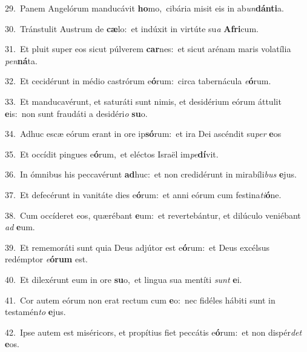 {\numbfont\textcolor{\numbcolor}{29.}}~Panem Angelórum manducávit \textbf{ho}\-mo,~\star cibária misit eis in ab\-\textit{un}\-\textbf{dán}\textbf{ti}a.\par
{\numbfont\textcolor{\numbcolor}{30.}}~Tránstulit Austrum de \textbf{cæ}\-lo:~\star et indúxit in virtúte su\textit{a} \textbf{A}\-\textbf{fri}cum.\par
{\numbfont\textcolor{\numbcolor}{31.}}~Et pluit super eos sicut púlverem \textbf{car}\-nes:~\star et sicut arénam maris volatília \textit{pen}\-\textbf{ná}ta.\par
{\numbfont\textcolor{\numbcolor}{32.}}~Et cecidérunt in médio castrórum e\-\textbf{ó}\-rum:~\star circa tabernácula \textit{e}\-\textbf{ó}rum.\par
{\numbfont\textcolor{\numbcolor}{33.}}~Et manducavérunt, et saturáti sunt nimis, et desidérium eórum áttulit \textbf{e}\-is:~\star non sunt fraudáti a desidéri\textit{o} \textbf{su}\-o.\par
{\numbfont\textcolor{\numbcolor}{34.}}~Adhuc escæ eórum erant in ore ip\-\textbf{só}\-rum:~\star et ira Dei ascéndit su\textit{per} \textbf{e}\-os\par
{\numbfont\textcolor{\numbcolor}{35.}}~Et occídit pingues e\-\textbf{ó}\-rum,~\star et eléctos Israël im\-\textit{pe}\-\textbf{dí}vit.\par
{\numbfont\textcolor{\numbcolor}{36.}}~In ómnibus his peccavérunt \textbf{ad}\-huc:~\star et non credidérunt in mirabíli\textit{bus} \textbf{e}\-jus.\par
{\numbfont\textcolor{\numbcolor}{37.}}~Et defecérunt in vanitáte dies e\-\textbf{ó}\-rum:~\star et anni eórum cum festina\-\textit{ti}\-\textbf{ó}ne.\par
{\numbfont\textcolor{\numbcolor}{38.}}~Cum occíderet eos, quærébant \textbf{e}\-um:~\star et revertebántur, et dilúculo veniébant \textit{ad} \textbf{e}\-um.\par
{\numbfont\textcolor{\numbcolor}{39.}}~Et rememoráti sunt quia Deus adjútor est e\-\textbf{ó}\-rum:~\star et Deus excélsus redémptor \textit{e}\-\textbf{ó}\textbf{rum} est.\par
{\numbfont\textcolor{\numbcolor}{40.}}~Et dilexérunt eum in ore \textbf{su}\-o,~\star et lingua sua mentíti \textit{sunt} \textbf{e}\-i.\par
{\numbfont\textcolor{\numbcolor}{41.}}~Cor autem eórum non erat rectum cum \textbf{e}\-o:~\star nec fidéles hábiti sunt in testamén\textit{to} \textbf{e}\-jus.\par
{\numbfont\textcolor{\numbcolor}{42.}}~Ipse autem est miséricors, et propítius fiet peccátis e\-\textbf{ó}\-rum:~\star et non dispér\textit{det} \textbf{e}\-os.\par
